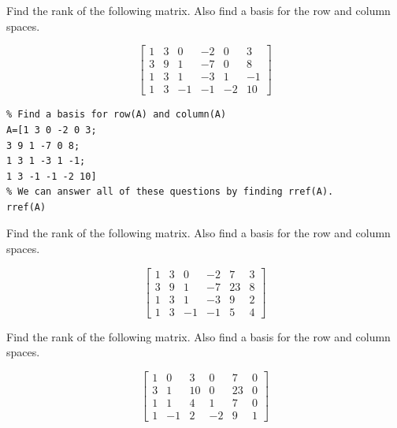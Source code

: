 \documentclass{ximera}
\begin{document}
\begin{problem}\label{prb:5.32} Find the rank of the following matrix. Also find a basis for the row
and column spaces.
 
 
$$\begin{bmatrix}
1 & 3 & 0 & -2 & 0 & 3 \\
3 & 9 & 1 & -7 & 0 & 8 \\
1 & 3 & 1 & -3 & 1 & -1 \\
1 & 3 & -1 & -1 & -2 & 10
\end{bmatrix}$$
 
\begin{hint}
    \begin{verbatim}
% Find a basis for row(A) and column(A)
A=[1 3 0 -2 0 3;
3 9 1 -7 0 8;
1 3 1 -3 1 -1;
1 3 -1 -1 -2 10]
% We can answer all of these questions by finding rref(A).
rref(A)
\end{verbatim}
\end{hint}
\end{problem}
 
\begin{problem}\label{prb:5.33} Find the rank of the following matrix. Also find a basis for the row
and column spaces.
 
$$\begin{bmatrix}
1 & 3 & 0 & -2 & 7 & 3 \\
3 & 9 & 1 & -7 & 23 & 8 \\
1 & 3 & 1 & -3 & 9 & 2 \\
1 & 3 & -1 & -1 & 5 & 4
\end{bmatrix}$$
\end{problem}
 
\begin{problem}\label{prb:5.34} Find the rank of the following matrix. Also find a basis for the row
and column spaces.
 
$$\begin{bmatrix}
1 & 0 & 3 & 0 & 7 & 0 \\
3 & 1 & 10 & 0 & 23 & 0 \\
1 & 1 & 4 & 1 & 7 & 0 \\
1 & -1 & 2 & -2 & 9 & 1
\end{bmatrix}$$
\end{problem}
 
 
\end{document}
